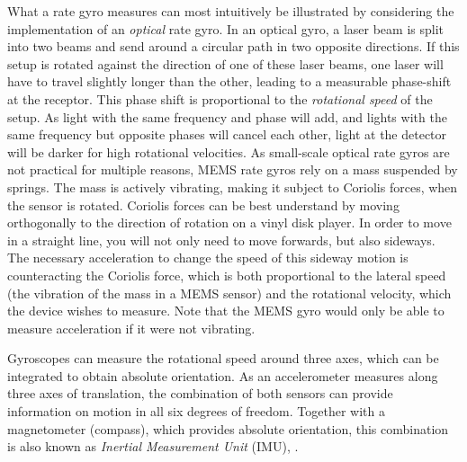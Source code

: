 What a rate gyro  measures can most intuitively be illustrated by considering the implementation of an \emph{optical} rate gyro. In an optical gyro, a laser beam is split into two beams and send around a circular path in two opposite directions. If this setup is rotated against the direction of one of these laser beams, one laser will have to travel slightly longer than the other, leading to a measurable phase-shift at the receptor. This phase shift is proportional to the \emph{rotational speed} of the setup. As light with the same frequency and phase will add, and lights with the same frequency but opposite phases will cancel each other, light at the detector will be darker for high rotational velocities. As small-scale optical rate gyros are not practical for multiple reasons, MEMS rate gyros rely on a mass suspended by springs. The mass is actively vibrating, making it subject to Coriolis forces, when the sensor is rotated. Coriolis forces can be best understand by moving orthogonally to the direction of rotation on a vinyl disk player. In order to move in a straight line, you will not only need to move forwards, but also sideways. The necessary acceleration to change the speed of this sideway motion is counteracting the Coriolis force, which is both proportional to the lateral speed (the vibration of the mass in a MEMS sensor) and the rotational velocity, which the device wishes to measure. Note that the MEMS gyro would only be able to measure acceleration if it were not vibrating.

Gyroscopes can measure the rotational speed around three axes, which can be integrated to obtain absolute orientation. As an accelerometer measures along three axes of translation, the combination of both sensors can provide information on motion in all six degrees of freedom. Together with a magnetometer (compass), which provides absolute orientation, this combination is also known as \emph{Inertial Measurement Unit} (IMU), .

